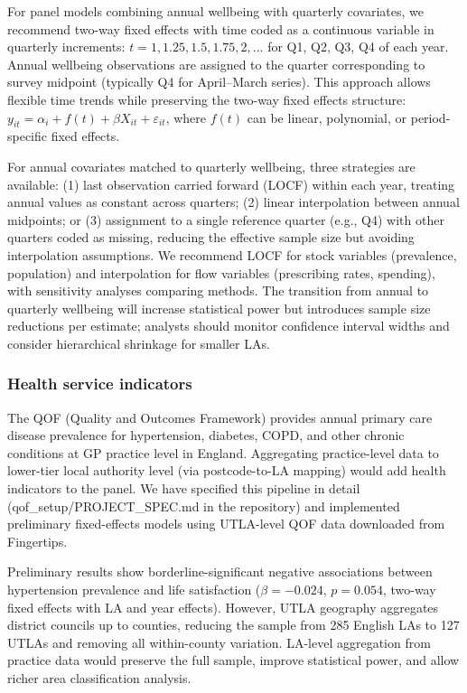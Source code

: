 \documentclass[12pt,a4paper]{article}
\begin{document}
For panel models combining annual wellbeing with quarterly covariates, we recommend two-way fixed effects with time coded as a continuous variable in quarterly increments: $t = 1, 1.25, 1.5, 1.75, 2, \ldots$ for Q1, Q2, Q3, Q4 of each year. Annual wellbeing observations are assigned to the quarter corresponding to survey midpoint (typically Q4 for April--March series). This approach allows flexible time trends while preserving the two-way fixed effects structure: $y_{it} = \alpha_i + f(t) + \beta X_{it} + \varepsilon_{it}$, where $f(t)$ can be linear, polynomial, or period-specific fixed effects.

For annual covariates matched to quarterly wellbeing, three strategies are available: (1) last observation carried forward (LOCF) within each year, treating annual values as constant across quarters; (2) linear interpolation between annual midpoints; or (3) assignment to a single reference quarter (e.g., Q4) with other quarters coded as missing, reducing the effective sample size but avoiding interpolation assumptions. We recommend LOCF for stock variables (prevalence, population) and interpolation for flow variables (prescribing rates, spending), with sensitivity analyses comparing methods. The transition from annual to quarterly wellbeing will increase statistical power but introduces sample size reductions per estimate; analysts should monitor confidence interval widths and consider hierarchical shrinkage for smaller LAs.

\subsubsection{Health service indicators}

The QOF (Quality and Outcomes Framework) provides annual primary care disease prevalence for hypertension, diabetes, COPD, and other chronic conditions at GP practice level in England. Aggregating practice-level data to lower-tier local authority level (via postcode-to-LA mapping) would add health indicators to the panel. We have specified this pipeline in detail (qof\_setup/PROJECT\_SPEC.md in the repository) and implemented preliminary fixed-effects models using UTLA-level QOF data downloaded from Fingertips.

Preliminary results show borderline-significant negative associations between hypertension prevalence and life satisfaction ($\beta = -0.024$, $p = 0.054$, two-way fixed effects with LA and year effects). However, UTLA geography aggregates district councils up to counties, reducing the sample from 285 English LAs to 127 UTLAs and removing all within-county variation. LA-level aggregation from practice data would preserve the full sample, improve statistical power, and allow richer area classification analysis.
\end{document}
